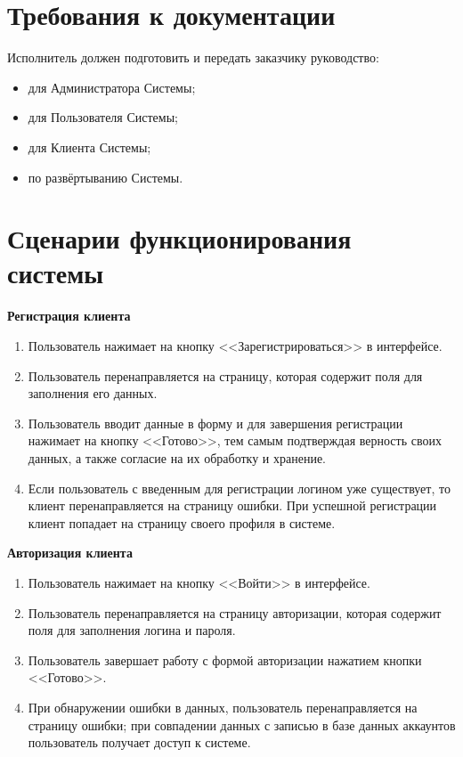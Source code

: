 \section*{Требования к документации}
Исполнитель должен подготовить и передать заказчику руководство:
\begin{itemize}
	\item для Администратора Системы;
	
	\item для Пользователя Системы;
	
	\item для Клиента Системы;
	
	\item по развёртыванию Системы.
\end{itemize}

\section*{Сценарии функционирования системы}
\textbf{Регистрация клиента}
\begin{enumerate}
	\item Пользователь нажимает на кнопку <<Зарегистрироваться>> в интерфейсе.
	
	\item Пользователь перенаправляется на страницу, которая содержит поля для заполнения его данных.
	
	\item Пользователь вводит данные в форму и для завершения регистрации нажимает на кнопку <<Готово>>, тем самым подтверждая верность своих данных, а также согласие на их обработку и хранение.
	
	\item Если пользователь с введенным для регистрации логином уже существует, то клиент перенаправляется на страницу ошибки. При успешной регистрации клиент попадает на страницу своего профиля в системе. \\
\end{enumerate}

\textbf{Авторизация клиента}
\begin{enumerate}
	\item Пользователь нажимает на кнопку <<Войти>> в интерфейсе.
	
	\item Пользователь перенаправляется на страницу авторизации, которая содержит поля для заполнения логина и пароля.
	
	\item Пользователь завершает работу с формой авторизации нажатием кнопки <<Готово>>.
	
	\item При обнаружении ошибки в данных, пользователь перенаправляется на страницу ошибки; при совпадении данных с записью в базе данных аккаунтов пользователь получает доступ к системе. \\
\end{enumerate}

